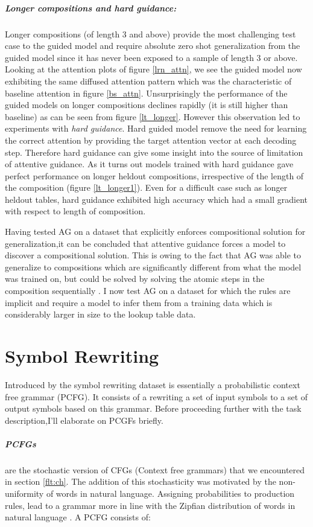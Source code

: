 \subparagraph{Longer compositions and hard guidance:} Longer compositions (of length 3 and above) provide the most challenging test case to the guided model and require absolute zero shot generalization from the guided model since it has never been exposed to a sample of length 3 or above. Looking at the attention plots of figure \ref{lrn_attn}, we see the guided model now exhibiting the same diffused attention pattern which was the characteristic of baseline attention in figure \ref{bs_attn}. Unsurprisingly the performance of the guided models on longer compositions declines rapidly (it is still higher than baseline) as can be seen from figure \ref{lt_longer}.
However this observation led to experiments with \textit{hard guidance}. Hard guided model remove the need for learning the correct attention by providing the target attention vector at each decoding step. Therefore hard guidance can give some insight into the source of limitation of attentive guidance. As it turns out models trained with hard guidance gave perfect performance on longer heldout compositions, irrespective of the length of the composition (figure \ref{lt_longer1}). Even for a difficult case such as longer heldout tables, hard guidance exhibited high accuracy which had a small gradient with respect to length of composition.

Having tested AG on a dataset that explicitly enforces compositional solution for generalization,it can be concluded that attentive guidance forces a model to discover a compositional solution. This is owing to the fact that AG was able to generalize to compositions which are significantly different from what the model was trained on, but could be solved by solving the atomic steps in the composition sequentially . I now test AG on a dataset for which the rules are implicit and require a model to infer them from a training data which is considerably larger in size to the lookup table data. 



\section{Symbol Rewriting} \label{datasets:sr}
Introduced by \cite{Weber2018} the symbol rewriting dataset is essentially a probabilistic context free grammar (PCFG). It consists of a rewriting a set of input symbols to a set of output symbols based on this grammar. Before proceeding further with the task description,I'll elaborate on PCGFs briefly.

\subparagraph{PCFGs} are the stochastic version of CFGs (Context free grammars) that we encountered in section \ref{flt:ch}. The addition of this stochasticity was motivated by the non-uniformity of words in natural language. Assigning probabilities to production rules, lead to a grammar more in line with the Zipfian distribution of words in natural language \citep{jurafsky2014speech}. A PCFG consists of:

